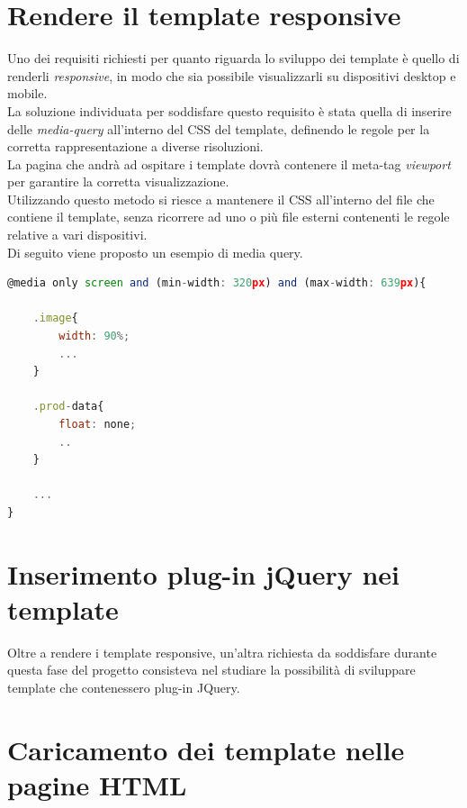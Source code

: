\section{Rendere il template responsive}
Uno dei requisiti richiesti per quanto riguarda lo sviluppo dei template è quello di renderli \textit{responsive}, in modo che sia possibile visualizzarli su dispositivi desktop e mobile.\\
La soluzione individuata per soddisfare questo requisito è stata quella di inserire delle \textit{media-query} all'interno del CSS del template, definendo le regole per la corretta rappresentazione a diverse risoluzioni.\\
La pagina che andrà ad ospitare i template dovrà contenere il meta-tag \textit{viewport} per garantire la corretta visualizzazione.\\
Utilizzando questo metodo si riesce a mantenere il CSS all'interno del file che contiene il template, senza ricorrere ad uno o più file esterni contenenti le regole relative a vari dispositivi.\\
\newpage
Di seguito viene proposto un esempio di media query.
\begin{lstlisting}[language=JavaScript, caption=Esempio di media query nel CSS del template.]
@media only screen and (min-width: 320px) and (max-width: 639px){

	.image{
		width: 90%;
		...
	}
	
	.prod-data{
		float: none;
		..
	}

	...
}
\end{lstlisting}

\section{Inserimento plug-in jQuery nei template}
Oltre a rendere i template responsive, un'altra richiesta da soddisfare durante questa fase del progetto consisteva nel studiare la possibilità di sviluppare template che contenessero plug-in JQuery.\\

\section{Caricamento dei template nelle pagine HTML}

